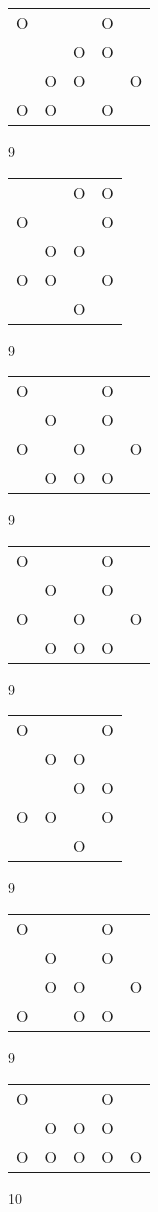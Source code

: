 \begin{tabular}{|m{0.2cm}m{0.2cm}m{0.2cm}m{0.2cm}m{0.2cm}|}\hline
O& & &O& \\
 & &O&O& \\
 &O&O& &O\\
O&O& &O& \\
\hline\end{tabular}9
\begin{tabular}{|m{0.2cm}m{0.2cm}m{0.2cm}m{0.2cm}|}\hline
 & &O&O\\
O& & &O\\
 &O&O& \\
O&O& &O\\
 & &O& \\
\hline\end{tabular}9
\begin{tabular}{|m{0.2cm}m{0.2cm}m{0.2cm}m{0.2cm}m{0.2cm}|}\hline
O& & &O& \\
 &O& &O& \\
O& &O& &O\\
 &O&O&O& \\
\hline\end{tabular}9
\begin{tabular}{|m{0.2cm}m{0.2cm}m{0.2cm}m{0.2cm}m{0.2cm}|}\hline
O& & &O& \\
 &O& &O& \\
O& &O& &O\\
 &O&O&O& \\
\hline\end{tabular}9
\begin{tabular}{|m{0.2cm}m{0.2cm}m{0.2cm}m{0.2cm}|}\hline
O& & &O\\
 &O&O& \\
 & &O&O\\
O&O& &O\\
 & &O& \\
\hline\end{tabular}9
\begin{tabular}{|m{0.2cm}m{0.2cm}m{0.2cm}m{0.2cm}m{0.2cm}|}\hline
O& & &O& \\
 &O& &O& \\
 &O&O& &O\\
O& &O&O& \\
\hline\end{tabular}9
\begin{tabular}{|m{0.2cm}m{0.2cm}m{0.2cm}m{0.2cm}m{0.2cm}|}\hline
O& & &O& \\
 &O&O&O& \\
O&O&O&O&O\\
\hline\end{tabular}10
